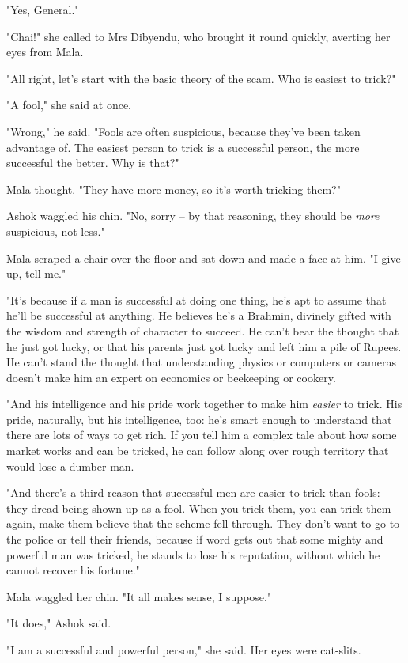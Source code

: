 "Yes, General."

"Chai!" she called to Mrs Dibyendu, who brought it round quickly,
averting her eyes from Mala.

"All right, let's start with the basic theory of the scam. Who is
easiest to trick?"

"A fool," she said at once.

"Wrong," he said. "Fools are often suspicious, because they've been
taken advantage of. The easiest person to trick is a successful
person, the more successful the better. Why is that?"

Mala thought. "They have more money, so it's worth tricking them?"

Ashok waggled his chin. "No, sorry -- by that reasoning, they
should be \emph{more} suspicious, not less."

Mala scraped a chair over the floor and sat down and made a face at
him. "I give up, tell me."

"It's because if a man is successful at doing one thing, he's apt
to assume that he'll be successful at anything. He believes he's a
Brahmin, divinely gifted with the wisdom and strength of character
to succeed. He can't bear the thought that he just got lucky, or
that his parents just got lucky and left him a pile of Rupees. He
can't stand the thought that understanding physics or computers or
cameras doesn't make him an expert on economics or beekeeping or
cookery.

"And his intelligence and his pride work together to make him
\emph{easier} to trick. His pride, naturally, but his intelligence,
too: he's smart enough to understand that there are lots of ways to
get rich. If you tell him a complex tale about how some market
works and can be tricked, he can follow along over rough territory
that would lose a dumber man.

"And there's a third reason that successful men are easier to trick
than fools: they dread being shown up as a fool. When you trick
them, you can trick them again, make them believe that the scheme
fell through. They don't want to go to the police or tell their
friends, because if word gets out that some mighty and powerful man
was tricked, he stands to lose his reputation, without which he
cannot recover his fortune."

Mala waggled her chin. "It all makes sense, I suppose."

"It does," Ashok said.

"I am a successful and powerful person," she said. Her eyes were
cat-slits.

